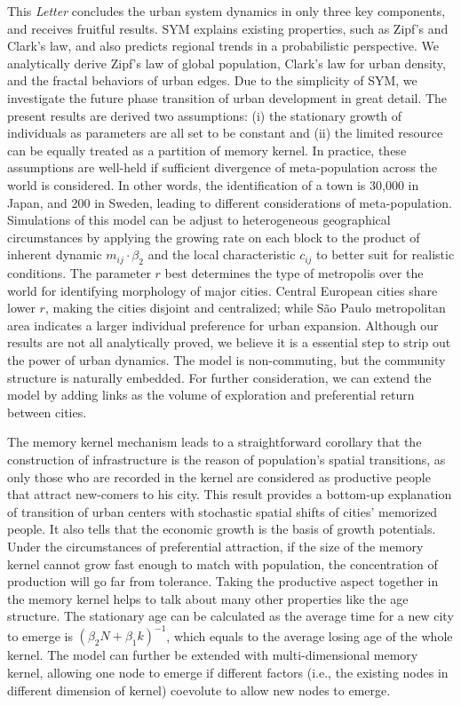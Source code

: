 \documentclass[reprint,unsortedaddress,amsmath,amssymb,aps,prl,showkeys]{revtex4-2}
\begin{document}
This \emph{Letter} concludes the urban system dynamics in only three key components, and receives fruitful results. SYM explains existing properties, such as Zipf's and Clark's law, and also predicts regional trends in a probabilistic perspective. We analytically derive 
Zipf's law of global population, Clark's law for urban density, and the fractal behaviors of urban edges. Due to the simplicity of SYM, we investigate the future phase transition of urban development in great detail. The present results are derived two assumptions: (i) the stationary growth of individuals as parameters are all set to be constant and (ii) the limited resource can be equally treated as a partition of memory kernel. In practice, these assumptions are well-held if sufficient divergence of meta-population across the world is considered. In other words, the identification of a town is 30,000 in Japan, and 200 in Sweden, leading to different considerations of meta-population. Simulations of this model can be adjust to heterogeneous geographical circumstances by applying the growing rate on each block to the product of inherent dynamic $m_{ij}\cdot \beta_2$ and the local characteristic $c_{ij}$ to better suit for realistic conditions. The parameter $r$ best determines the type of metropolis over the world for identifying morphology of major cities. Central European cities share lower $r$, making the cities disjoint and centralized; while São Paulo metropolitan area indicates a larger individual preference for urban expansion. Although our results are not all analytically proved, we believe it is a essential step to strip out the power of urban dynamics. The model is non-commuting, but the community structure is naturally embedded. For further consideration, we can extend the model by adding links as the volume of exploration and preferential return between cities\cite{WANG2019121921}.

The memory kernel mechanism leads to a straightforward corollary that the construction of infrastructure is the reason of population's spatial transitions, as only those who are recorded in the kernel are considered as productive people that attract new-comers to his city. This result provides a bottom-up explanation of transition of urban centers with stochastic spatial shifts of cities' memorized people. It also tells that the economic growth is the basis of growth potentials. Under the circumstances of preferential attraction, if the size of the memory kernel cannot grow fast enough to match with population, the concentration of production will go far from tolerance. Taking the productive aspect together in the memory kernel helps to talk about many other properties like the age structure. The stationary age can be calculated as the average time for a new city to emerge is $(\beta_2 N + \beta_1 k)^{-1}$, which equals to the average losing age of the whole kernel. The model can further be extended with multi-dimensional memory kernel, allowing one node to emerge if different factors (i.e., the existing nodes in different dimension of kernel) coevolute to allow new nodes to emerge.%



\end{document}
